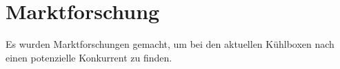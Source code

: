 
\chapter{Marktforschung}
Es wurden Marktforschungen gemacht, um bei den aktuellen Kühlboxen nach einen potenzielle Konkurrent zu finden.\par\medskip

